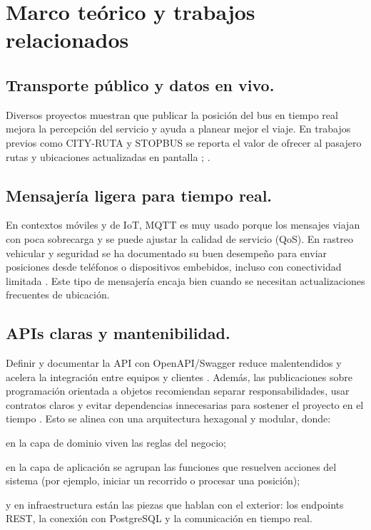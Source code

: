 \section{Marco teórico y trabajos relacionados}

\subsection{Transporte público y datos en vivo.}
Diversos proyectos muestran que publicar la posición del bus en tiempo real mejora la percepción del servicio y ayuda a planear mejor el viaje. En trabajos previos como CITY-RUTA y STOPBUS se reporta el valor de ofrecer al pasajero rutas y ubicaciones actualizadas en pantalla \cite{cityruta2018}; \cite{stopbus2016}.

\subsection{Mensajería ligera para tiempo real.}
En contextos móviles y de IoT, MQTT es muy usado porque los mensajes viajan con poca sobrecarga y se puede ajustar la calidad de servicio (QoS). En rastreo vehicular y seguridad se ha documentado su buen desempeño para enviar posiciones desde teléfonos o dispositivos embebidos, incluso con conectividad limitada \cite{sismo2016}. Este tipo de mensajería encaja bien cuando se necesitan actualizaciones frecuentes de ubicación.

\subsection{APIs claras y mantenibilidad.}
Definir y documentar la API con OpenAPI/Swagger reduce malentendidos y acelera la integración entre equipos y clientes \cite{easyrest2022}. Además, las publicaciones sobre programación orientada a objetos recomiendan separar responsabilidades, usar contratos claros y evitar dependencias innecesarias para sostener el proyecto en el tiempo \cite{poo2023}. Esto se alinea con una arquitectura hexagonal y modular, donde:

en la capa de dominio viven las reglas del negocio;

en la capa de aplicación se agrupan las funciones que resuelven acciones del sistema (por ejemplo, iniciar un recorrido o procesar una posición);

y en infraestructura están las piezas que hablan con el exterior: los endpoints REST, la conexión con PostgreSQL y la comunicación en tiempo real.

